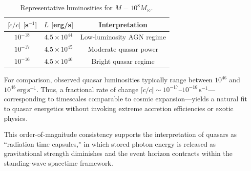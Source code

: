 \documentclass[12pt]{article}
\begin{document}
\begin{table}[h]
\centering
\caption{Representative luminosities for $M = 10^8 M_\odot$.}
\begin{tabular}{ccc}
\toprule
$\big|\dot{c}/c\big|$ [s$^{-1}$] & $L$ [erg/s] & Interpretation \\
\midrule
$10^{-18}$ & $4.5\times10^{44}$ & Low-luminosity AGN regime \\
$10^{-17}$ & $4.5\times10^{45}$ & Moderate quasar power \\
$10^{-16}$ & $4.5\times10^{46}$ & Bright quasar regime \\
\bottomrule
\end{tabular}
\end{table}

For comparison, observed quasar luminosities typically range between $10^{46}$ and $10^{48}\,\mathrm{erg\,s^{-1}}$. Thus, a fractional rate of change $\big|\dot{c}/c\big| \sim 10^{-17}\text{–}10^{-16}\,\mathrm{s^{-1}}$—corresponding to timescales comparable to cosmic expansion—yields a natural fit to quasar energetics without invoking extreme accretion efficiencies or exotic physics.

This order-of-magnitude consistency supports the interpretation of quasars as ``radiation time capsules,'' in which stored photon energy is released as gravitational strength diminishes and the event horizon contracts within the standing-wave spacetime framework.


\newpage

\end{document}
